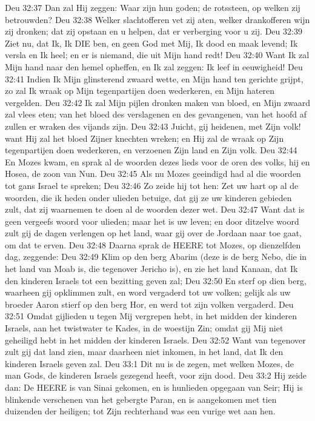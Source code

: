 Deu 32:37  Dan zal Hij zeggen: Waar zijn hun goden; de rotssteen, op welken zij betrouwden?
Deu 32:38  Welker slachtofferen vet zij aten, welker drankofferen wijn zij dronken; dat zij opstaan en u helpen, dat er verberging voor u zij.
Deu 32:39  Ziet nu, dat Ik, Ik DIE ben, en geen God met Mij, Ik dood en maak levend; Ik versla en Ik heel; en er is niemand, die uit Mijn hand redt!
Deu 32:40  Want Ik zal Mijn hand naar den hemel opheffen, en Ik zal zeggen: Ik leef in eeuwigheid!
Deu 32:41  Indien Ik Mijn glinsterend zwaard wette, en Mijn hand ten gerichte grijpt, zo zal Ik wraak op Mijn tegenpartijen doen wederkeren, en Mijn hateren vergelden.
Deu 32:42  Ik zal Mijn pijlen dronken maken van bloed, en Mijn zwaard zal vlees eten; van het bloed des verslagenen en des gevangenen, van het hoofd af zullen er wraken des vijands zijn.
Deu 32:43  Juicht, gij heidenen, met Zijn volk! want Hij zal het bloed Zijner knechten wreken; en Hij zal de wraak op Zijn tegenpartijen doen wederkeren, en verzoenen Zijn land en Zijn volk.
Deu 32:44  En Mozes kwam, en sprak al de woorden dezes lieds voor de oren des volks, hij en Hosea, de zoon van Nun.
Deu 32:45  Als nu Mozes geeindigd had al die woorden tot gans Israel te spreken;
Deu 32:46  Zo zeide hij tot hen: Zet uw hart op al de woorden, die ik heden onder ulieden betuige, dat gij ze uw kinderen gebieden zult, dat zij waarnemen te doen al de woorden dezer wet.
Deu 32:47  Want dat is geen vergeefs woord voor ulieden; maar het is uw leven; en door ditzelve woord zult gij de dagen verlengen op het land, waar gij over de Jordaan naar toe gaat, om dat te erven.
Deu 32:48  Daarna sprak de HEERE tot Mozes, op dienzelfden dag, zeggende:
Deu 32:49  Klim op den berg Abarim (deze is de berg Nebo, die in het land van Moab is, die tegenover Jericho is), en zie het land Kanaan, dat Ik den kinderen Israels tot een bezitting geven zal;
Deu 32:50  En sterf op dien berg, waarheen gij opklimmen zult, en word vergaderd tot uw volken; gelijk als uw broeder Aaron stierf op den berg Hor, en werd tot zijn volken vergaderd.
Deu 32:51  Omdat gijlieden u tegen Mij vergrepen hebt, in het midden der kinderen Israels, aan het twistwater te Kades, in de woestijn Zin; omdat gij Mij niet geheiligd hebt in het midden der kinderen Israels.
Deu 32:52  Want van tegenover zult gij dat land zien, maar daarheen niet inkomen, in het land, dat Ik den kinderen Israels geven zal.
Deu 33:1  Dit nu is de zegen, met welken Mozes, de man Gods, de kinderen Israels gezegend heeft, voor zijn dood.
Deu 33:2  Hij zeide dan: De HEERE is van Sinai gekomen, en is hunlieden opgegaan van Seir; Hij is blinkende verschenen van het gebergte Paran, en is aangekomen met tien duizenden der heiligen; tot Zijn rechterhand was een vurige wet aan hen.
